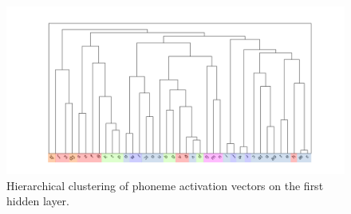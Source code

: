 \begin{figure}[t]
  \centering
  \includegraphics[scale=0.45]{figures/color-coded-activation0.png}
\caption{Hierarchical clustering of phoneme activation vectors on the first 
hidden layer.}
\label{fig:cluster-l0}
\end{figure}



